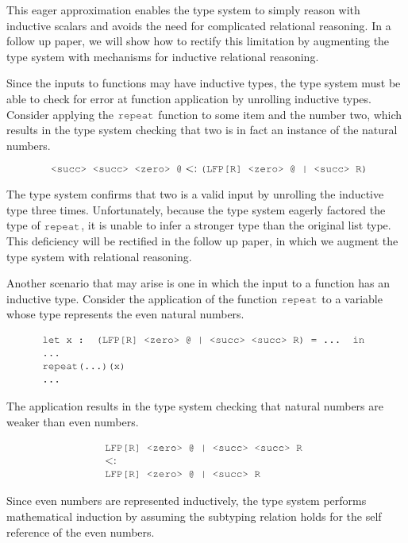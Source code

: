 \documentclass[acmsmall]{acmart}
\theoremstyle{definition}
\begin{document}
This eager approximation enables the type system
to simply reason with inductive scalars and avoids the need for complicated
relational reasoning. In a follow up paper,
we will show how to rectify this limitation by augmenting the type system with
mechanisms for inductive relational reasoning.

Since the inputs to functions may have inductive types, the type 
system must be able to check for error at function application by unrolling
inductive types.
Consider applying the $\J{repeat}$ function to some item and the number two, 
which results in the type system checking that two is in fact an instance of the natural numbers.

\[
  \J{ <succ> <succ> <zero> @} \subtypes \J{(LFP[R] <zero> @ | <succ> R)}
\]

The type system confirms that two is a valid input by unrolling the inductive type three times.
Unfortunately, because the type system eagerly factored the type of $\J{repeat}$, it
is unable to infer a stronger type than the original list type. This deficiency will
be rectified in the follow up paper, in which we augment the type system with relational reasoning.


Another scenario that may arise is one in which the input to a function has an inductive type.
Consider the application of the function $\J{repeat}$ to a variable whose type represents the even natural numbers.

\[
  \begin{array}[t]{@{} l}
    \J{let x : (LFP[R] <zero> @ | <succ> <succ> R) = ... in}
    \\
    \J{...}
    \\
    \J{repeat(...)(x)} 
    \\
    \J{...}
  \end{array}
\]

The application results in the type system checking that natural numbers are weaker than even numbers. 

\[
  \begin{array}[t]{@{} l}
    \J{LFP[R] <zero> @ | <succ> <succ> R}
    \\
    \subtypes
    \\
    \J{LFP[R] <zero> @ | <succ> R}
  \end{array}
\]


Since even numbers are represented inductively, the type system performs mathematical induction
by assuming the subtyping relation holds for the self reference of the even numbers. 
\end{document}
